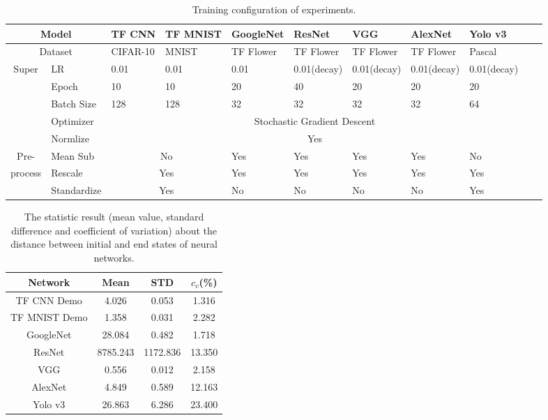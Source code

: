 \documentclass[letterpaper]{article} %
\begin{document}
\begin{table*}[]
    \centering
    \begin{tabularx}{\textwidth}{|c|X|X|X|X|X|X|X|X|X|X|}
    \hline
        \multicolumn{2}{|c|}{Model} & TF CNN & TF MNIST & GoogleNet & ResNet & VGG & AlexNet & Yolo v3\\
        \hline
        \multicolumn{2}{|c|}{Dataset} & CIFAR-10 & MNIST & TF Flower & TF Flower & TF Flower & TF Flower & Pascal\\
        \hline
        \multirow{2}{*}{Super} & LR & 0.01 & 0.01 & 0.01 & 0.01(decay) &0.01(decay) & 0.01(decay) & 0.01(decay)\\ \cline{2-9}

        \multirow{2}{*}{params}& Epoch & 10 & 10 & 20 & 40 & 20 & 20 & 20\\ \cline{2-9}
        & Batch Size & 128 &128 & 32 & 32&32 &32 &64 \\ \cline{2-9}
        & Optimizer & \multicolumn{7}{c|}{Stochastic Gradient Descent}\\
        \hline
         & Normlize & \multicolumn{7}{c|}{Yes} \\ \cline{2-9}
        Pre-& Mean Sub & \multicolumn{2}{c|}{No} &Yes &Yes &Yes &Yes  & No \\ \cline{2-9}
        process & Rescale &  \multicolumn{2}{c|}{Yes} &Yes &Yes &Yes &Yes & Yes\\\cline{2-9}
        & Standardize & \multicolumn{2}{c|}{Yes}&No &No &No &No  & Yes\\\cline{2-9}
    \hline
    \end{tabularx}
    \caption{Training configuration of experiments.}
    \label{Tab_traininginfo}
\end{table*}

\begin{table}[]
    \centering
    \begin{tabular}{|c|c|c|c|}
    \hline
    Network &  Mean & STD & $c_v$(\%) \\
    \hline
    TF CNN Demo & 4.026  & 0.053 & 1.316 \\
    TF MNIST Demo & 1.358 & 0.031 & 2.282 \\
    GoogleNet & 28.084 & 0.482 & 1.718\\
    ResNet & 8785.243 & 1172.836 & 13.350 \\
    VGG & 0.556 & 0.012 & 2.158 \\
    AlexNet & 4.849 & 0.589 & 12.163\\
    Yolo v3 & 26.863 & 6.286 & 23.400  \\
    \hline
    \end{tabular}
    \caption{The statistic result (mean value, standard difference and coefficient of variation) about the distance between initial and end states of neural networks.}
    \label{Tab_distancestatistic}
\end{table}
\end{document}
